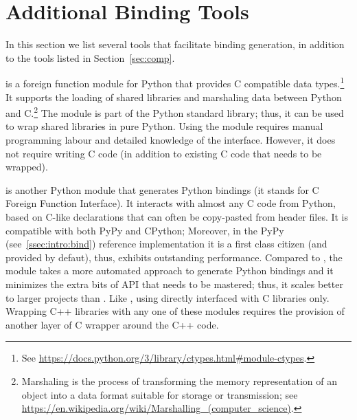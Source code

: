 \section{Additional Binding Tools}
\label{sec:tools}
In this section we list several tools that facilitate binding generation, in addition to the tools listed in Section~\ref{sec:comp}.

 is a foreign function module for Python that provides C compatible data types.\footnote{See \url{https://docs.python.org/3/library/ctypes.html\#module-ctypes}.} It supports the loading of shared libraries and marshaling data between Python and C.\footnote{Marshaling is the process of transforming the memory representation of an object into a data format suitable for storage or transmission; see \url{https://en.wikipedia.org/wiki/Marshalling\_(computer\_science)}.} The  module is part of the Python standard library; thus, it can be used to wrap shared libraries in pure Python. Using the  module requires manual programming labour and detailed knowledge of the  interface. However, it does not require writing C code (in addition to existing C code that needs to be wrapped).

 is another Python module that generates Python bindings (it stands for C Foreign Function Interface). It interacts with almost any C code from Python, based on C-like declarations that can often be copy-pasted from header files. It is compatible with both PyPy and CPython; Moreover, in the PyPy (see~\ref{ssec:intro:bind})
reference implementation it is a first class citizen (and provided by defaut), thus, exhibits outstanding performance. Compared to , the  module takes a more automated approach to generate Python bindings and it minimizes the extra bits of API that needs to be mastered; thus, it scales better to larger projects than . Like , using  directly interfaced with C libraries only. Wrapping C++ libraries with any one of these modules requires the provision of another layer of C wrapper around the C++ code.

